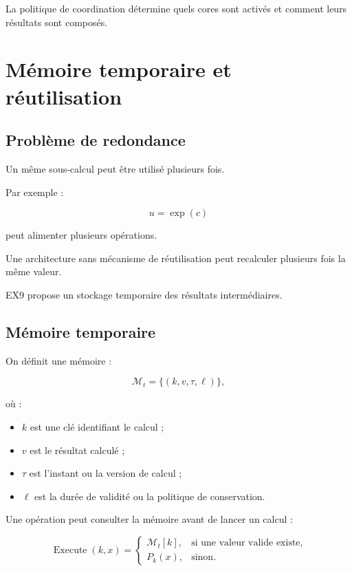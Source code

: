 \documentclass[11pt,a4paper]{article}
\begin{document}
La politique de coordination détermine quels cores sont activés
et comment leurs résultats sont composés.

\section{Mémoire temporaire et réutilisation}

\subsection{Problème de redondance}

Un même sous-calcul peut être utilisé plusieurs fois.

Par exemple :

\[
u=\exp(c)
\]

peut alimenter plusieurs opérations.

Une architecture sans mécanisme de réutilisation peut recalculer
plusieurs fois la même valeur.

EX9 propose un stockage temporaire des résultats intermédiaires.

\subsection{Mémoire temporaire}

On définit une mémoire :

\[
\mathcal{M}_t
=
\{(k,v,\tau,\ell)\},
\]

où :
\begin{itemize}
  \item $k$ est une clé identifiant le calcul ;
  \item $v$ est le résultat calculé ;
  \item $\tau$ est l'instant ou la version de calcul ;
  \item $\ell$ est la durée de validité ou la politique de conservation.
\end{itemize}

Une opération peut consulter la mémoire avant de lancer un calcul :

\[
\operatorname{Execute}(k,x)
=
\begin{cases}
\mathcal{M}_t[k],
& \text{si une valeur valide existe},\\
P_k(x),
& \text{sinon}.
\end{cases}
\]
\end{document}
